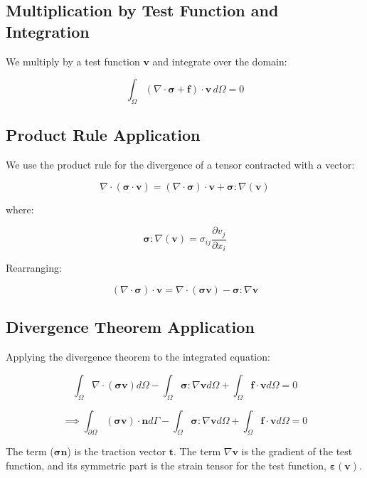 \documentclass[
  11pt,
  a4paper,
]{scrbook}
\begin{document}
\subsection{Multiplication by Test Function and
Integration}\label{multiplication-by-test-function-and-integration}

We multiply by a test function \(\mathbf{v}\) and integrate over the
domain:

\[\int_{\Omega} (\nabla \cdot \boldsymbol{\sigma} + \mathbf{f}) \cdot \mathbf{v} \, d\Omega = 0\]

\subsection{Product Rule Application}\label{product-rule-application}

We use the product rule for the divergence of a tensor contracted with a
vector:

\[\nabla \cdot (\boldsymbol{\sigma}\cdot\mathbf{v}) = (\nabla \cdot \boldsymbol{\sigma})\cdot \mathbf{v} + \boldsymbol{\sigma}:\nabla(\mathbf{v})\]

where:

\[\boldsymbol{\sigma}:\nabla(\mathbf{v}) = \sigma_{ij}\frac{\partial v_j}{\partial x_i}\]

Rearranging:

\[(\nabla \cdot \boldsymbol{\sigma}) \cdot \mathbf{v} = \nabla \cdot (\boldsymbol{\sigma}\mathbf{v}) - \boldsymbol{\sigma} : \nabla\mathbf{v}\]

\subsection{Divergence Theorem
Application}\label{divergence-theorem-application}

Applying the divergence theorem to the integrated equation:

\[\int_{\Omega} \nabla \cdot (\boldsymbol{\sigma}\mathbf{v}) d\Omega - \int_{\Omega} \boldsymbol{\sigma} : \nabla\mathbf{v} d\Omega + \int_{\Omega} \mathbf{f} \cdot \mathbf{v} d\Omega = 0\]

\[\implies \int_{\partial\Omega} (\boldsymbol{\sigma}\mathbf{v}) \cdot \mathbf{n} d\Gamma - \int_{\Omega} \boldsymbol{\sigma} : \nabla\mathbf{v} d\Omega + \int_{\Omega} \mathbf{f} \cdot \mathbf{v} d\Omega = 0\]

The term (\(\boldsymbol{\sigma}\boldsymbol{n}\)) is the traction vector
\(\boldsymbol{t}\). The term \(\nabla \boldsymbol{v}\) is the gradient
of the test function, and its symmetric part is the strain tensor for
the test function, \(\boldsymbol{\varepsilon}(\boldsymbol{v})\).
\end{document}
